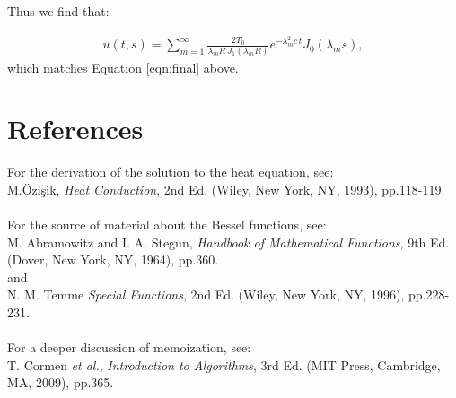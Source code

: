 \documentclass[a4paper,12pt]{article}
\begin{document}
Thus we find that:

\begin{eqnarray}
u(t,s) = \sum_{m=1}^{\infty}\frac{2 T_0}{\lambda_m R\, J_1(\lambda_m R)} e^{-\lambda_m^2 c\,t} J_0(\lambda_m s),\nonumber
\end{eqnarray}
%
which matches Equation \ref{eqn:final} above.

\section*{References}
For the derivation of the solution to the heat equation, see:\\
M.\"{O}zi\c{s}ik, \emph{Heat Conduction}, 2nd Ed. (Wiley, New York, NY, 1993), pp.118-119.\\
\\
For the source of material about the Bessel functions, see:\\
M. Abramowitz and I. A. Stegun, \emph{Handbook of Mathematical Functions}, 9th Ed. (Dover, New York, NY, 1964), pp.360.\\
and\\
N. M. Temme \emph{Special Functions}, 2nd Ed. (Wiley, New York, NY, 1996), pp.228-231.\\
\\
For a deeper discussion of memoization, see:\\
T. Cormen \emph{et al.}, \emph{Introduction to Algorithms}, 3rd Ed. (MIT Press, Cambridge, MA, 2009), pp.365.
\end{document}
